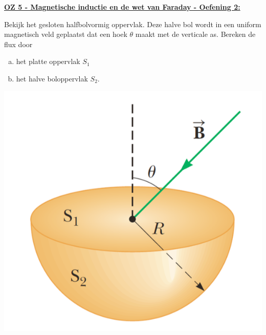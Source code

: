 \textbf{\underline{OZ 5 - Magnetische inductie en de wet van Faraday - Oefening 2:}}
\vspace{0.5cm}


\begin{minipage}{0.76\textwidth}
    Bekijk het gesloten halfbolvormig oppervlak. Deze halve bol wordt in een uniform magnetisch veld geplaatst dat een hoek $\theta$ maakt met de verticale as. Bereken de flux door 
    \begin{enumerate}[(a)]
        \item het platte oppervlak $S_1$
        \item het halve boloppervlak $S_2$.
    \end{enumerate}
\end{minipage}
\begin{minipage}{0.2\textwidth}
    \begin{center}
        \includegraphics[scale = 0.35]{oz05/resources/Oz5Oef2.png}
    \end{center}
\end{minipage}


